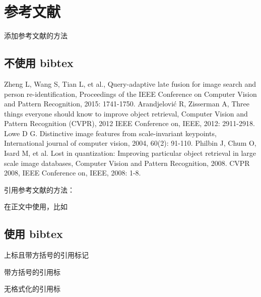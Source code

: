 \documentclass[UTF8]{ctexart}
\begin{document}
    \section{参考文献}
    添加参考文献的方法

    \subsection{不使用 bibtex}
    \begin{thebibliography}{99}  
        Zheng L, Wang S, Tian L, et al., Query-adaptive late fusion for image search and person re-identification, Proceedings of the IEEE Conference on Computer Vision and Pattern Recognition, 2015: 1741-1750.  
        Arandjelović R, Zisserman A, Three things everyone should know to improve object retrieval, Computer Vision and Pattern Recognition (CVPR), 2012 IEEE Conference on, IEEE, 2012: 2911-2918.  
        Lowe D G. Distinctive image features from scale-invariant keypoints, International journal of computer vision, 2004, 60(2): 91-110.  
        Philbin J, Chum O, Isard M, et al. Lost in quantization: Improving particular object retrieval in large scale image databases, Computer Vision and Pattern Recognition, 2008. CVPR 2008, IEEE Conference on, IEEE, 2008: 1-8.  
    \end{thebibliography}

    引用参考文献的方法：

    在正文中使用\cite{ref1}，比如\cite{ref1, ref4}
    \subsection{使用 bibtex}
    上标且带方括号的引用标记 \cite{greenwade93}

    带方括号的引用标\parencite{greenwade93}

    无格式化的引用标\supercite{yerlanova2021high}

    \printbibliography
\end{document}
